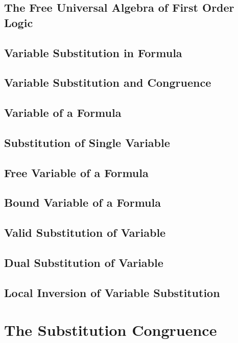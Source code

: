 \documentclass{report}
\begin{document}
    \subsection{The Free Universal Algebra of First Order Logic}
      
    \subsection{Variable Substitution in Formula}
      
    \subsection{Variable Substitution and Congruence}
      
    \subsection{Variable of a Formula}
      
    \subsection{Substitution of Single Variable}
      
    \subsection{Free Variable of a Formula}
      
    \subsection{Bound Variable of a Formula}
      
    \subsection{Valid Substitution of Variable}
      
    \subsection{Dual Substitution of Variable}
      
    \subsection{Local Inversion of Variable Substitution}
      
\section{The Substitution Congruence}
\end{document}
